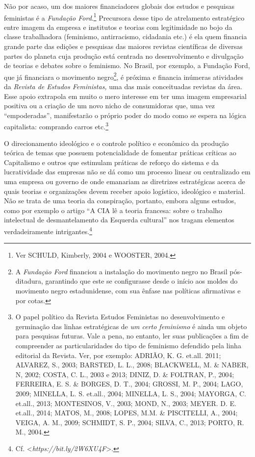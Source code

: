 Não por acaso, um dos maiores financiadores globais dos estudos e
pesquisas feministas é a \emph{Fundação Ford}.\footnote{Ver SCHULD,
  Kimberly, 2004 e WOOSTER, 2004.} Precursora desse tipo de atrelamento
estratégico entre imagem da empresa e institutos e teorias com
legitimidade no bojo da classe trabalhadora (feminismo, antirracismo,
cidadania etc.) é ela quem financia grande parte das edições e pesquisas
das maiores revistas científicas de diversas partes do planeta cuja
produção está centrada no desenvolvimento e divulgação de teorias e
debates sobre o feminismo. No Brasil, por exemplo, a Fundação Ford, que
já financiara o movimento negro\footnote{A \emph{Fundaçāo Ford}
  financiou a instalação do movimento negro no Brasil pós-ditadura,
  garantindo que este se configurasse desde o início aos moldes do
  movimento negro estadunidense, com sua ênfase nas políticas
  afirmativas e por cotas.}, é próxima e financia inúmeras atividades da
\emph{Revista de Estudos Feministas,} uma das mais conceituadas revistas
da área. Esse apoio extrapola em muito o mero interesse em ter uma
imagem empresarial positiva ou a criação de um novo nicho de
consumidoras que, uma vez ``empoderadas'', manifestarão o próprio poder
do modo como se espera na lógica capitalista: comprando carros
etc.\footnote{O papel político da Revista Estudos Feministas no
  desenvolvimento e germinação das linhas estratégicas de \emph{um certo
  feminismo} é ainda um objeto para pesquisas futuras. Vale a pena, no
  entanto, ler suas publicações a fim de compreender as particularidades
  do tipo de feminismo defendido pela linha editorial da Revista. Ver,
  por exemplo: ADRIÃO, K. G. et.all. 2011; ALVAREZ, S., 2003; BARSTED,
  L. L., 2008; BLACKWELL, M. \& NABER, N, 2002; COSTA, C. L., 2003 e
  2013; DINIZ, D. \& FOLTRAN, P., 2004; FERREIRA, E. S. \& BORGES, D.
  T., 2004; GROSSI, M. P., 2004; LAGO, 2009; MINELLA, L. S. et.all.,
  2004; MINELLA, L. S., 2004; MAYORGA, C. et.all., 2013; MONTESINOS, V.,
  2003; MOND, N., 2003; MEYER. D. E. et.all., 2014; MATOS, M., 2008;
  LOPES, M.M. \& PISCITELLI, A., 2004; VEIGA, A. M., 2009; SCHMIDT, S.
  P., 2004; SILVA, C., 2013; PORTO, R. M., 2004.}

O direcionamento ideológico e o controle político e econômico da
produção teórica de temas que possuem potencialidade de fomentar
práticas críticas ao Capitalismo e outros que estimulam práticas de
reforço do sistema e da lucratividade das empresas não se dá como um
processo linear ou centralizado em uma empresa ou governo de onde
emanariam as diretrizes estratégicas acerca de quais teorias e
organizações devem receber apoio logístico, ideológico e material. Não
se trata de uma teoria da conspiração, portanto, embora alguns estudos,
como por exemplo o artigo ``A CIA lê a teoria francesa: sobre o trabalho
intelectual de desmantelamento da Esquerda cultural'' nos tragam
elementos verdadeiramente intrigantes.\footnote{Cf.
  \textless{}\emph{https://bit.ly/2W6XU4F}\textgreater{}.}

